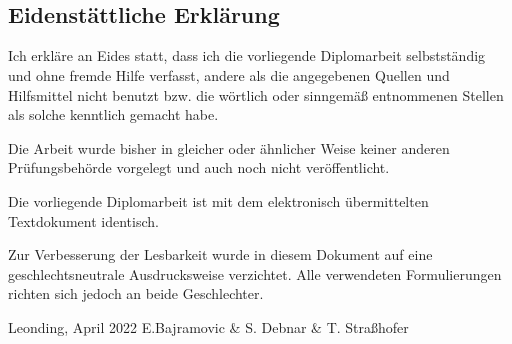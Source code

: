\thispagestyle{empty}
\vspace{3cm}
~ \\ \\
\begin{spacing}{1}
    \chapter*{Eidenstättliche Erklärung}
\end{spacing}
Ich erkläre an Eides statt, dass ich die vorliegende Diplomarbeit selbstständig und ohne fremde Hilfe verfasst, andere als die angegebenen Quellen und Hilfsmittel nicht benutzt bzw. die wörtlich oder sinngemäß entnommenen Stellen als solche kenntlich gemacht habe.

Die Arbeit wurde bisher in gleicher oder ähnlicher Weise keiner anderen Prüfungsbehörde vorgelegt und auch noch nicht veröffentlicht.

Die vorliegende Diplomarbeit ist mit dem elektronisch übermittelten Textdokument identisch.

Zur Verbesserung der Lesbarkeit wurde in diesem Dokument auf eine geschlechtsneutrale Ausdrucksweise verzichtet.
Alle verwendeten Formulierungen richten sich jedoch an beide Geschlechter.


\begin{tabbing}
\doublespacing
Leonding, April 2022 \hspace{3.5cm} E.Bajramovic \& S. Debnar \& T. Straßhofer
\end{tabbing}
\vspace{10cm}
\setcounter{page}{1}

